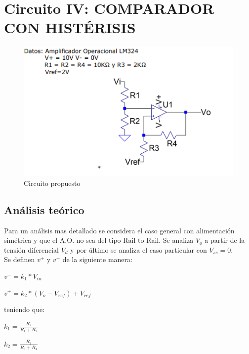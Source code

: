 \documentclass[11pt, a4paper]{article}
\begin{document}
\section{Circuito IV: COMPARADOR CON HISTÉRISIS}
\begin{figure}[htb]
	\centering
	\includegraphics[width=1\textwidth]{Imagenes/circuito4.png}
	\caption{Circuito propuesto}
\end{figure}
\subsection{Análisis teórico}
Para un análisis mas detallado se considera el caso general con alimentación simétrica y que el A.O. no sea del tipo Rail to Rail. Se analiza $V_o$ a partir de la tensión diferencial $V_d$ y por último se analiza el caso particular con $V_{ss}=0$.\\
Se definen $v^+$ y $v^-$ de la siguiente manera:
\begin{center}
	$v^- = k_1 * V_{in}$
\end{center}
\begin{center}
	$v^+ = k_2 * (V_o - V_{ref})+V_{ref}$
\end{center}
teniendo que:
\begin{center}
	$k_1 = \frac{R_2}{R_1 + R_2}$
\end{center}
\begin{center}
	$k_2 = \frac{R_3}{R_3 + R_4}$
\end{center}
\end{document}
